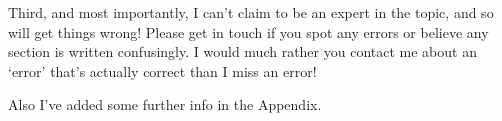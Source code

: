 \documentclass[a4paper,11pt,twoside]{report}
\begin{document}
\begin{sloppypar}
Third, and most importantly, I can't claim to be an expert in the topic, and so will get things wrong! Please get in touch if you spot any errors or believe any section is written confusingly. I would much rather you contact me about an `error' that's actually correct than I miss an error!

Also I've added some further info in the Appendix. 
















\end{sloppypar}
\end{document}
